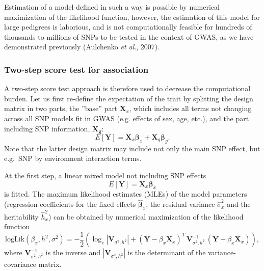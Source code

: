 \documentclass[12pt,a4paper]{article}
\begin{document}
Estimation of a model defined in such a way is possible by numerical
maximization of the likelihood function, however, the estimation of
this model for large pedigrees is laborious, and is not
computationally feasible for hundreds of thousands to millions of SNPs
to be tested in the context of GWAS, as we have demonstrated
previously (Aulchenko \emph{et al}., 2007).

\subsubsection{Two-step score test for association}
A two-step score test approach is therefore used to decrease the computational
burden. Let us first re-define the expectation of the trait by splitting the
design matrix in two parts, the ''base'' part $\mathbf{X}_x$, which includes all
terms not changing across all SNP models fit in GWAS (e.g. effects of sex, age, etc.),
and the part including SNP information, $\mathbf{X_g}$:
$$
E[\mathbf{Y}] = \mathbf{X}_x \mathbf{\beta}_x +
\mathbf{X}_g \mathbf{\beta}_g.
$$
Note that the latter design matrix may include not only the main SNP effect, but
e.g.\ SNP by environment interaction terms.

At the first step, a linear mixed model not including SNP effects
$$
E[\mathbf{Y}] = \mathbf{X}_x \mathbf{\beta}_x
$$
is fitted. The maximum likelihood estimates (MLEs) of the model parameters (regression coefficients for
the fixed effects $\hat{\mathbf{\beta}}_x$, the
residual variance $\hat{\sigma}^2_x$ and the heritability $\hat{h}^2_x$) can
be obtained by numerical maximization of the likelihood function
$$
\mathrm{logLik}(\beta_x,h^2,\sigma^2) = -\frac{1}{2} \left(
  \log_e|\mathbf{V}_{\sigma^2,h^2}| + (\mathbf{Y} - \beta_x
  \mathbf{X}_x)^T \, \mathbf{V}_{\sigma^2,h^2}^{-1} \, (\mathbf{Y} -
  \beta_x \mathbf{X}_x) \right ),
$$
where $\mathbf{V}_{\sigma^2,h^2}^{-1}$ is the inverse and
$|\mathbf{V}_{\sigma^2,h^2}|$ is the determinant of the variance-covariance matrix.
\end{document}
